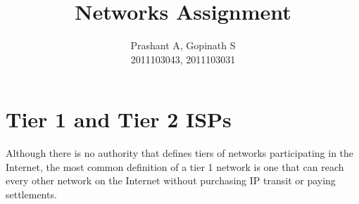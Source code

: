 \documentclass[20pt]{article}
\begin{document}
\title{Networks Assignment}
\author
{
	{Prashant A, Gopinath S\\
	2011103043, 2011103031}
}
\maketitle
\section{Tier 1 and Tier 2 ISPs}
Although there is no authority that defines tiers of networks participating in the Internet, the most common definition of a tier 1 network is one that can reach every other network on the Internet without purchasing IP transit or paying settlements.
\end{document}
